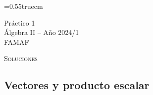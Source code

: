 \documentclass[a4paper,12pt,twoside,spanish,reqno]{amsbook}
\numberwithin{equation}{section}
\begin{document}
    \baselineskip=0.55truecm %
    
    
    {\bf \begin{center} Práctico 1 \\ Álgebra  II -- Año 2024/1 \\ FAMAF \end{center}}
    


\bigbreak

\centerline{\textsc{Soluciones}}

\bigbreak 

\subsection*{Vectores y producto escalar}
\end{document}
